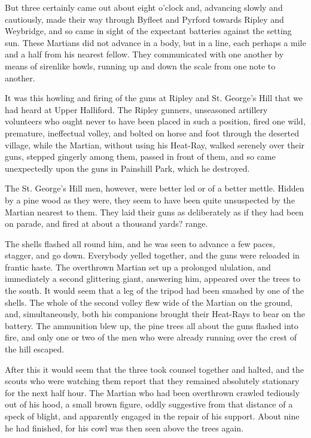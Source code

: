 But three certainly came out about eight o'clock and, advancing
slowly and cautiously, made their way through Byfleet and Pyrford
towards Ripley and Weybridge, and so came in sight of the expectant
batteries against the setting sun. These Martians did not advance
in a body, but in a line, each perhaps a mile and a half from his
nearest fellow. They communicated with one another by means of
sirenlike howls, running up and down the scale from one note to
another.

It was this howling and firing of the guns at Ripley and St.
George's Hill that we had heard at Upper Halliford. The Ripley
gunners, unseasoned artillery volunteers who ought never to have
been placed in such a position, fired one wild, premature,
ineffectual volley, and bolted on horse and foot through the
deserted village, while the Martian, without using his Heat-Ray,
walked serenely over their guns, stepped gingerly among them,
passed in front of them, and so came unexpectedly upon the guns in
Painshill Park, which he destroyed.

The St. George's Hill men, however, were better led or of a better
mettle. Hidden by a pine wood as they were, they seem to have been
quite unsuspected by the Martian nearest to them. They laid their
guns as deliberately as if they had been on parade, and fired at
about a thousand yards? range.

The shells flashed all round him, and he was seen to advance a few
paces, stagger, and go down. Everybody yelled together, and the
guns were reloaded in frantic haste. The overthrown Martian set up
a prolonged ululation, and immediately a second glittering giant,
answering him, appeared over the trees to the south. It would seem
that a leg of the tripod had been smashed by one of the shells. The
whole of the second volley flew wide of the Martian on the ground,
and, simultaneously, both his companions brought their Heat-Rays to
bear on the battery. The ammunition blew up, the pine trees all
about the guns flashed into fire, and only one or two of the men
who were already running over the crest of the hill escaped.

After this it would seem that the three took counsel together and
halted, and the scouts who were watching them report that they
remained absolutely stationary for the next half hour. The Martian
who had been overthrown crawled tediously out of his hood, a small
brown figure, oddly suggestive from that distance of a speck of
blight, and apparently engaged in the repair of his support. About
nine he had finished, for his cowl was then seen above the trees
again.

